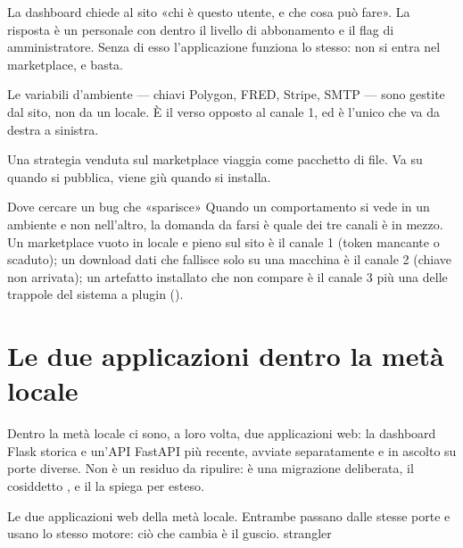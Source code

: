 \begin{description}[leftmargin = 2.2em, style = nextline, itemsep = 6pt]
  \item[\textbf{1} --- identità e permessi]
    La dashboard chiede al sito «chi è questo utente, e che cosa può fare».
    La risposta è un  personale con dentro il livello di
    abbonamento e il flag di amministratore. Senza di esso l'applicazione
    funziona lo stesso: non si entra nel marketplace, e basta.
  \item[\textbf{2} --- chiavi e impostazioni]
    Le variabili d'ambiente --- chiavi Polygon, FRED, Stripe, SMTP --- sono
    gestite dal sito, non da un  locale. È il verso opposto al
    canale 1, ed è l'unico che va da destra a sinistra.
  \item[\textbf{3} --- artefatti]
    Una strategia venduta sul marketplace viaggia come pacchetto di file. Va
    su quando si pubblica, viene giù quando si installa.
\end{description}

\begin{nota}{Dove cercare un bug che «sparisce»}
Quando un comportamento si vede in un ambiente e non nell'altro, la domanda da
farsi è quale dei tre canali è in mezzo. Un marketplace vuoto in locale e
pieno sul sito è il canale 1 (token mancante o scaduto); un download dati che
fallisce solo su una macchina è il canale 2 (chiave non arrivata); un
artefatto installato che non compare è il canale 3 più una delle trappole del
sistema a plugin ().
\end{nota}

\section{Le due applicazioni dentro la metà locale}\label{sez:strangler-intro}

Dentro la metà locale ci sono, a loro volta, due applicazioni web: la
dashboard Flask storica e un'API FastAPI più recente, avviate separatamente e
in ascolto su porte diverse. Non è un residuo da ripulire: è una migrazione
deliberata, il cosiddetto , e il  la
spiega per esteso.

  {Le due applicazioni web della metà locale. Entrambe passano dalle stesse
   porte e usano lo stesso motore: ciò che cambia è il guscio.}
  {strangler}
